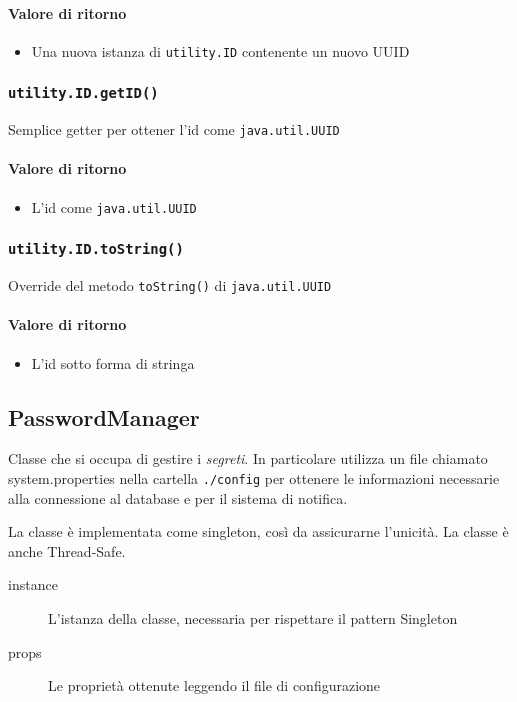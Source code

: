 \paragraph{Valore di ritorno}
\begin{itemize}
\item Una nuova istanza di \texttt{utility.ID} contenente un nuovo UUID
\end{itemize}

\subsubsection{\texttt{utility.ID.getID()}}
Semplice getter per ottener l'id come \texttt{java.util.UUID}

\paragraph{Valore di ritorno}
\begin{itemize}
\item L'id come \texttt{java.util.UUID}
\end{itemize}

\subsubsection{\texttt{utility.ID.toString()}}
Override del metodo \texttt{toString()} di \texttt{java.util.UUID}
\paragraph{Valore di ritorno}
\begin{itemize}
\item L'id sotto forma di stringa
\end{itemize}


\subsection{PasswordManager}
Classe che si occupa di gestire i \textit{segreti}. In particolare
utilizza un file chiamato system.properties nella cartella
\texttt{./config} per ottenere le informazioni necessarie alla
connessione al database e per il sistema di notifica.
 
La classe è implementata come singleton, così da assicurarne
l'unicità.  La classe è anche Thread-Safe.

\begin{description}
\item[instance] L'istanza della classe, necessaria per rispettare il pattern Singleton
\item[props] Le proprietà ottenute leggendo il file di configurazione
\end{description}

